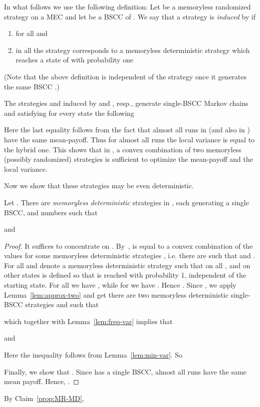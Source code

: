In what follows we use the following definition: Let  be a memoryless randomized strategy on a MEC  and let  be a BSCC of . We say that a strategy  is {\em induced} by  if 
\begin{enumerate}
\item  for all  and 
\item in all  the strategy  corresponds to a memoryless deterministic strategy which reaches a state of  with probability one
\end{enumerate}
(Note that the above definition is independent of the strategy  once it generates the same BSCC .)

The strategies  and  induced by  and , resp., generate single-BSCC Markov chains  and  satisfying for every state  the following

Here the last equality follows from the fact that almost all runs in  (and also in ) have the same mean-payoff. Thus for almost all runs the local variance is equal to the hybrid one. This shows that in , a convex combination of two memoryless (possibly randomized) strategies is sufficient to optimize the mean-payoff and the local variance. 

Now we show that these strategies may be even deterministic.
\begin{claim}\label{prop:MR-MD}
Let .
There are {\em memoryless deterministic} strategies  in , each generating a single BSCC, and numbers  such that

and

\end{claim}
\begin{proof}
It suffices to concentrate on . 
By~\cite{derman1970finite},  is equal to a convex combination of the values  for some memoryless deterministic strategies , i.e. there are  such that  and .
For all  and  denote
 a memoryless deterministic strategy such that  on all , and on other states  is defined so that
 is reached with probability 1, independent of the starting state.
For all  we have ,
while for  we have . Hence
.
Since , we apply Lemma~\ref{lem:approx-two} and get
there are two memoryless deterministic single-BSCC strategies  and  such that

which together with Lemma~\ref{lem:freq-var} implies that

and

Here the inequality follows from Lemma~\ref{lem:min-var}. So

Finally, we show that . Since  has a single BSCC, almost all runs have the same mean payoff. Hence, .
\end{proof}
\noindent
By Claim~\ref{prop:MR-MD},
 
